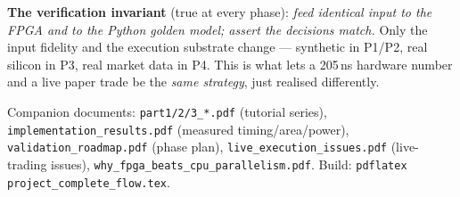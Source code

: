 \documentclass[10pt,a4paper]{article}
\newcommand{\fpath}[1]{\texttt{\textcolor{hdrblue}{#1}}}
\begin{document}
\textbf{The verification invariant} (true at every phase): \emph{feed identical
input to the FPGA and to the Python golden model; assert the decisions match.}
Only the input fidelity and the execution substrate change --- synthetic in P1/P2,
real silicon in P3, real market data in P4. This is what lets a 205\,ns hardware
number and a live paper trade be the \emph{same strategy}, just realised
differently.

\vfill
{\small\color{rulegray} Companion documents: \fpath{part1/2/3\_*.pdf} (tutorial
series), \fpath{implementation\_results.pdf} (measured timing/area/power),
\fpath{validation\_roadmap.pdf} (phase plan), \fpath{live\_execution\_issues.pdf}
(live-trading issues), \fpath{why\_fpga\_beats\_cpu\_parallelism.pdf}. Build:
\texttt{pdflatex project\_complete\_flow.tex}.}
\end{document}
